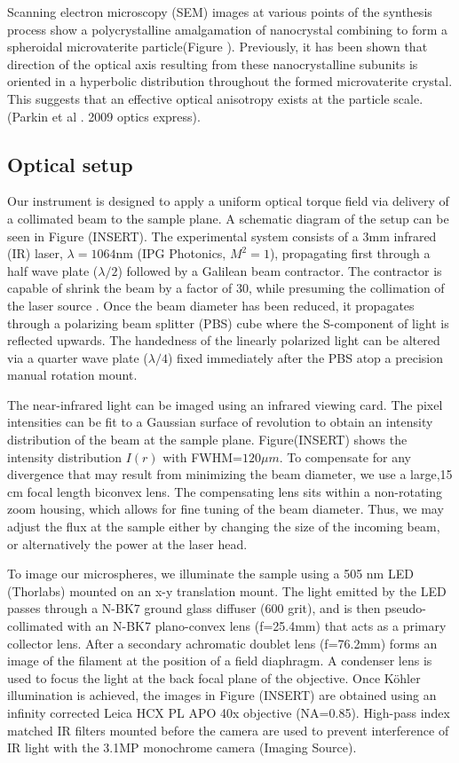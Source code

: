 \documentclass[12pt]{article}
\begin{document}
Scanning electron microscopy (SEM) images at various points of the synthesis process show a polycrystalline amalgamation of nanocrystal combining to form a spheroidal microvaterite particle(Figure ). Previously, it has been shown that direction of the optical axis resulting from these nanocrystalline subunits is oriented in a hyperbolic distribution throughout the formed microvaterite crystal. This suggests that an effective optical anisotropy exists at the particle scale. (Parkin et al . 2009 optics express).
\subsection*{Optical setup}
Our instrument is designed to apply a uniform optical torque field via delivery of a collimated beam to the sample plane. A schematic diagram of the setup can be seen in Figure (INSERT). The experimental system consists of a 3mm infrared (IR) laser, $\lambda=1064$nm (IPG Photonics, $M^{2}=1$), propagating first through a half wave plate ($\lambda/2$) followed by a Galilean beam contractor. The contractor is capable of shrink the beam by a factor of 30, while presuming the collimation of the laser source . Once the beam diameter has been reduced, it propagates through a polarizing beam splitter (PBS) cube where the S-component of light is reflected upwards. The handedness of the linearly polarized light can be altered via a quarter wave plate ($\lambda/4$) fixed immediately after the PBS atop a precision manual rotation mount. 

The near-infrared light can be imaged using an infrared viewing card. The pixel intensities can be fit to a Gaussian surface of revolution to obtain an intensity distribution of the beam at the sample plane. Figure(INSERT) shows the intensity distribution $I(r)$ with FWHM=$120\mu m$. To compensate for any divergence that may result from minimizing the beam diameter, we use a large,15 cm focal length biconvex lens. The compensating lens sits within a non-rotating zoom housing, which allows for fine tuning of the beam diameter. Thus, we may adjust the flux at the sample either by changing the size of the incoming beam, or alternatively the power at the laser head. 

To image our microspheres, we illuminate the sample using a 505 nm LED (Thorlabs) mounted on an x-y translation mount. The light emitted by the LED passes through a N-BK7 ground glass diffuser (600 grit), and is then pseudo-collimated with an N-BK7 plano-convex lens (f=25.4mm) that acts as a primary collector lens. After a secondary achromatic doublet lens (f=76.2mm) forms an image of the filament at the position of a field diaphragm. A condenser lens is used to focus the light at the back focal plane of the objective. Once Köhler illumination is achieved, the images in Figure (INSERT) are obtained using an infinity corrected Leica HCX PL APO 40x objective (NA=0.85). High-pass index matched IR filters mounted before the camera are used to prevent interference of IR light with the 3.1MP monochrome camera (Imaging Source). 
\end{document}
